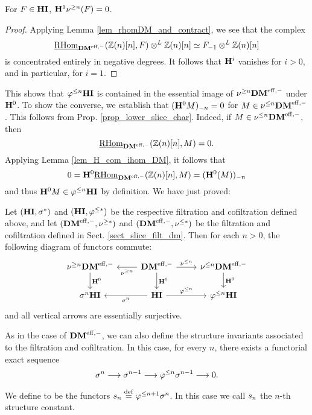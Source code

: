 \begin{lem}\label{lem_H1_sgDM_vanishes}
For $F \in \HI$, $\HH^1 \sgDM{n}(F) = 0$.
\end{lem}
\begin{proof}
Applying Lemma \ref{lem_rhomDM_and_contract}, we see that the
complex
\[
\ihomDMf(\Z(n)[n], F) \tDM \Z(n)[n] \simeq \RHI{F} \tDM \Z(n)[n]
\] 
is concentrated entirely in negative degrees. It follows that 
$\HH^i$ vanishes for $i > 0$, and in particular, for $i = 
1$.
\end{proof}

This shows that $\tlHI{n}\HI$ is contained in the essential image 
of $\sgDM{n}\DMeff$ under $\HH^0$. To show the converse, we 
establish that $\RHI[n]{(\HH^0 M)} = 0$ for $M \in 
\slDM{n}\DMeff$. This follows from Prop. 
\ref{prop_lower_slice_char}. Indeed, if $M \in \slDM{n}\DMeff$, 
then 
\[
\ihomDMf(\Z(n)[n], M) = 0.
\] 
Applying Lemma \ref{lem_H_com_ihom_DM}, it follows that
\[
0 = \HH^0\ihomDMf(\Z(n)[n], M) = \RHI[n]{(\HH^0(M))}
\]
and thus $\HH^0 M \in \tlHI{n}\HI$ by definition. We
have just proved:

\begin{prop}\label{prop_H_commute_with_filt}
Let $(\HI, \sgHI{*})$ and $(\HI, \tlHI{*})$ be the respective 
filtration and cofiltration defined above, and let $(\DMeff, 
\sgDM{*})$ and $(\DMeff, \slDM{*})$ be the filtration and
cofiltration defined in Sect. \ref{sect_slice_filt_dm}. Then
for each $n > 0$, the following diagram of functors commute:
\[
\begin{tikzcd}
\sgDM{n}\DMeff \arrow{d}{\HH^0} &
\DMeff \arrow{l}{\sgDM{n}} \arrow{r}{\slDM{n}} \arrow{d}{\HH^0} &
\slDM{n}\DMeff \arrow{d}{\HH^0} \\
\sgHI{n}\HI &
\HI \arrow{l}{\sgHI{n}} \arrow{r}{\tlHI{n}} &
\tlHI{n}\HI 
\end{tikzcd}
\]
and all vertical arrows are essentially surjective.
\end{prop}

As in the case of $\DMeff$, we can also define the structure 
invariants associated to the filtration and cofiltration. In this
case, for every $n$, there exists a functorial exact sequence
\[
\sgHI{n} \to \sgHI{n - 1} \to \tlHI{n}\sgHI{n - 1} \to 0.
\]
\begin{defn}
We define  to be the 
functors $\slice{n} \defeq \tlHI{n + 1}\sgHI{n}$. In this case we 
call $\slice{n}$ the $n$-th structure constant.
\end{defn}

